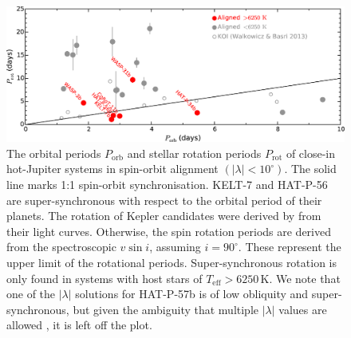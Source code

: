 \documentclass[useAMS,usenatbib]{mn2e}
\begin{document}
\begin{figure}
  \includegraphics[width=14cm]{plots/Porb_Prot.eps}
  \caption{\label{fig:porb_prot}The orbital periods $P_\text{orb}$ and stellar rotation periods $P_\text{rot}$ of close-in hot-Jupiter systems in spin-orbit alignment $(|\lambda| < 10^\circ)$. The solid line marks 1:1 spin-orbit synchronisation. KELT-7 and HAT-P-56 are super-synchronous with respect to the orbital period of their planets. The rotation of Kepler candidates were derived by \citet{2013MNRAS.436.1883W} from their light curves. Otherwise, the spin rotation periods are derived from the spectroscopic $v\sin i$, assuming $i=90^\circ$. These represent the upper limit of the rotational periods. Super-synchronous rotation is only found in systems with host stars of $T_\text{eff}>6250\,\text{K}$. We note that one of the $|\lambda|$ solutions for HAT-P-57b is of low obliquity and super-synchronous, but given the ambiguity that multiple $|\lambda|$ values are allowed \citep{2015AJ....150..197H}, it is left off the plot.}
\end{figure}
\end{document}
